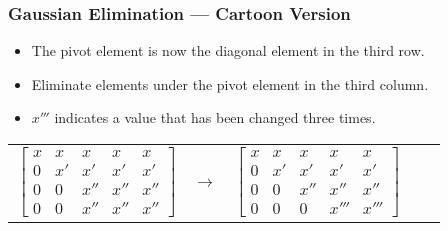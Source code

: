 \documentclass[10pt]{beamer}
\begin{document}
\begin{frame}
\frametitle{Gaussian Elimination --- Cartoon Version}
\begin{itemize}
    \item The pivot element is now the diagonal element in the third row.
    \item Eliminate elements under the pivot element in the third column.
    \item $x'''$ indicates a value that has been changed three times.
\end{itemize}
\begin{center}
	\renewcommand{\arraystretch}{1.3}
	\footnotesize
	\begin{tabular}{ccccc}
		$\begin{bmatrix} x & x  &     x       & x   & x   \\
						 0 & x' &     x'      & x'  & x'  \\
						 0 & 0  & \boxed{x''} & x'' & x'' \\
						 0 & 0  &     x''     & x'' & x'' \end{bmatrix}$ 
		& $\longrightarrow$ &
		$\begin{bmatrix} x & x  &     x       & x    & x   \\
						 0 & x' &     x'      & x'   & x'  \\
						 0 & 0  & \boxed{x''} & x''  & x'' \\
						 0 & 0  &     0       & x''' & x''' \end{bmatrix}$ 
	\end{tabular}
\end{center}

\end{frame}
\end{document}
